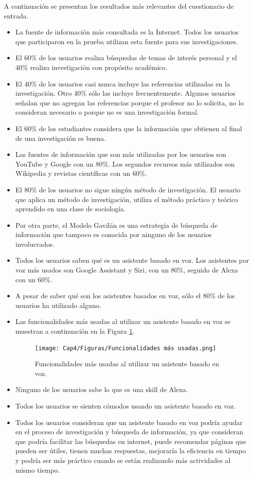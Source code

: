 A continuación se presentan los resultados más relevantes del cuestionario de entrada.

\begin{itemize}
  \item La fuente de información más consultada es la Internet. Todos los usuarios que participaron en la prueba utilizan esta fuente para sus investigaciones.
  \item El 60\% de los usuarios realiza búsquedas de temas de interés personal y el 40\% realiza investigación con propósito académico.
  \item El 40\% de los usuarios casi nunca incluye las referencias utilizadas en la investigación. Otro 40\% sólo las incluye frecuentemente. Algunos usuarios señalan que no agregan las referencias porque el profesor no lo solicita, no lo consideran necesario o porque no es una investigación formal.  
  \item El 60\% de los estudiantes considera que la información que obtienen al final de una investigación es buena.
  \item Las fuentes de información que son más utilizadas por los usuarios son YouTube y Google con un 80\%. Los segundos recursos más utilizados son Wikipedia y revistas científicas con un 60\%.
  \item El 80\% de los usuarios no sigue ningún método de investigación. El usuario que aplica un método de investigación, utiliza el método práctico y teórico aprendido en una clase de sociología.
  \item Por otra parte, el Modelo Gavilán es una estrategia de búsqueda de información que tampoco es conocida por ninguno de los usuarios involucrados.
  \item Todos los usuarios saben qué es un asistente basado en voz. Los asistentes por voz más usados son Google Assistant y Siri, con un 80\%, seguido de Alexa con un 60\%.
  \item A pesar de saber qué son los asistentes basados en voz, sólo el 80\% de los usuarios ha utilizado alguno.
  \item Las funcionalidades más usadas al utilizar un asistente basado en voz se muestran a continuación en la Figura \ref{fig:425}.
  \begin{figure}[H]
    \centering
    \texttt{[image: Cap4/Figuras/Funcionalidades más usadas.png]}
    \caption{Funcionalidades más usadas al utilizar un asistente basado en voz.}
    \label{fig:425}
  \end{figure}
  \item Ninguno de los usuarios sabe lo que es una skill de Alexa.
  \item Todos los usuarios se sienten cómodos usando un asistente basado en voz.
  \item Todos los usuarios consideran que un asistente basado en voz podría ayudar en el proceso de investigación y búsqueda de información, ya que consideran que podría facilitar las búsquedas en internet, puede recomendar páginas que pueden ser útiles, tienen muchas respuestas, mejoraría la eficiencia en tiempo y podría ser más práctico cuando se están realizando más actividades al mismo tiempo.
\end{itemize}


